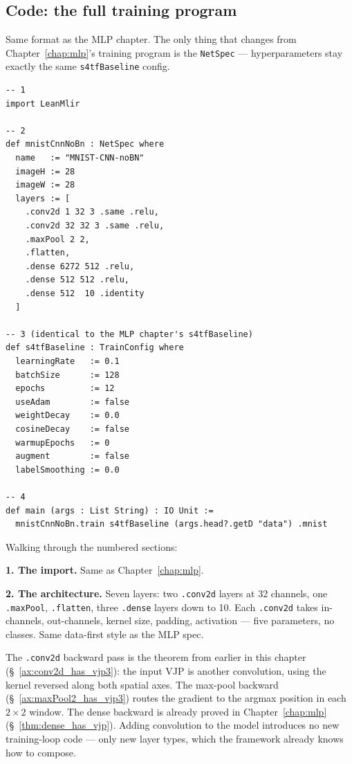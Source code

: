 \subsection*{Code: the full training program}

Same format as the MLP chapter. The only thing that changes from
Chapter~\ref{chap:mlp}'s training program is the \texttt{NetSpec}
--- hyperparameters stay exactly the same \texttt{s4tfBaseline}
config.

\begin{verbatim}
-- 1
import LeanMlir

-- 2
def mnistCnnNoBn : NetSpec where
  name   := "MNIST-CNN-noBN"
  imageH := 28
  imageW := 28
  layers := [
    .conv2d 1 32 3 .same .relu,
    .conv2d 32 32 3 .same .relu,
    .maxPool 2 2,
    .flatten,
    .dense 6272 512 .relu,
    .dense 512 512 .relu,
    .dense 512  10 .identity
  ]

-- 3 (identical to the MLP chapter's s4tfBaseline)
def s4tfBaseline : TrainConfig where
  learningRate   := 0.1
  batchSize      := 128
  epochs         := 12
  useAdam        := false
  weightDecay    := 0.0
  cosineDecay    := false
  warmupEpochs   := 0
  augment        := false
  labelSmoothing := 0.0

-- 4
def main (args : List String) : IO Unit :=
  mnistCnnNoBn.train s4tfBaseline (args.head?.getD "data") .mnist
\end{verbatim}

Walking through the numbered sections:

\textbf{1. The import.} Same as Chapter~\ref{chap:mlp}.

\textbf{2. The architecture.} Seven layers: two \texttt{.conv2d}
layers at 32 channels, one \texttt{.maxPool}, \texttt{.flatten},
three \texttt{.dense} layers down to 10. Each \texttt{.conv2d}
takes in-channels, out-channels, kernel size, padding, activation
--- five parameters, no classes. Same data-first style as the MLP
spec.

The \texttt{.conv2d} backward pass is the theorem from earlier in
this chapter (\S~\ref{ax:conv2d_has_vjp3}): the input VJP is
another convolution, using the kernel reversed along both spatial
axes. The max-pool backward (\S~\ref{ax:maxPool2_has_vjp3}) routes
the gradient to the argmax position in each $2 \times 2$ window.
The dense backward is already proved in
Chapter~\ref{chap:mlp} (\S~\ref{thm:dense_has_vjp}). Adding
convolution to the model introduces no new training-loop code ---
only new layer types, which the framework already knows how to
compose.

